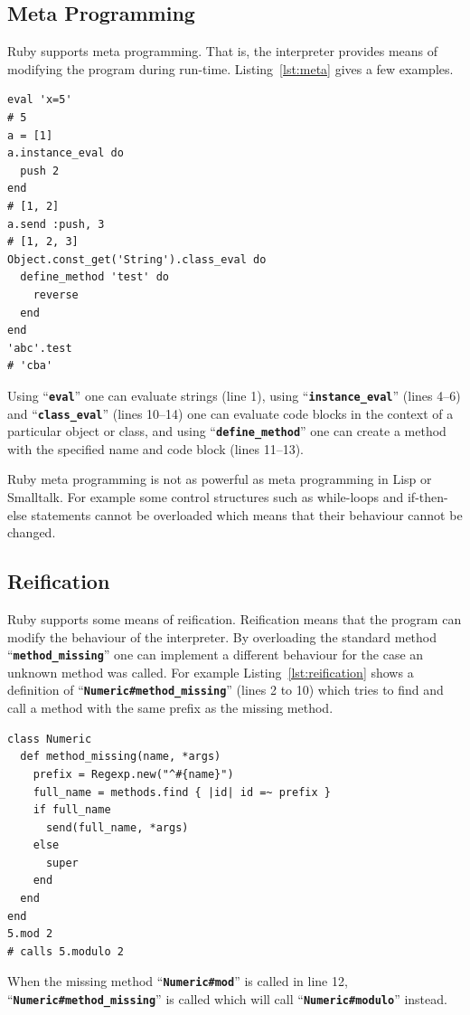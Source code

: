 \documentclass[12pt,a4paper,oneside,openright]{book}
\newcommand{\Eg}{For ex\-am\-ple }
\newcommand{\Ie}{That is, }
\newcommand{\lst}[1]{Listing~\ref{lst:#1}}
\newcommand{\code}[1]{``\texttt{\textbf{\textcolor{codegray}{\small{#1}}}}''}
\begin{document}
\begin{CJK}{UTF8}{}
\subsection{Meta Programming}\label{cha:metaprog}
Ruby supports meta programming. \Ie the interpreter provides means of modifying the program during run-time. \lst{meta} gives a few examples.
\lstset{language=Ruby,frame=single,numbers=left}
\begin{lstlisting}[float=htbp,caption={Meta programming in Ruby},label=lst:meta]
eval 'x=5'                                 
# 5
a = [1]
a.instance_eval do
  push 2
end                                        
# [1, 2]
a.send :push, 3                            
# [1, 2, 3]
Object.const_get('String').class_eval do
  define_method 'test' do
    reverse
  end
end
'abc'.test                                 
# 'cba'
\end{lstlisting}
Using \code{eval} one can evaluate strings (line 1), using \code{instance\_eval} (lines 4--6) and \code{class\_eval} (lines 10--14) one can evaluate code blocks in the context of a particular object or class, and using \code{define\_method} one can create a method with the specified name and code block (lines 11--13).

Ruby meta programming is not as powerful as meta programming in Lisp or Smalltalk. \Eg some control structures such as while-loops and if-then-else statements cannot be overloaded which means that their behaviour cannot be changed.

\subsection{Reification}
Ruby supports some means of reification. Reification means that the program can modify the behaviour of the interpreter. By overloading the standard method \code{method\_missing} one can implement a different behaviour for the case an unknown method was called. \Eg \lst{reification} shows a definition of \code{Numeric\#method\_missing} (lines 2 to 10) which tries to find and call a method with the same prefix as the missing method.
\lstset{language=Ruby,frame=single,numbers=left}
\begin{lstlisting}[float=htbp,caption={Reification in Ruby},label=lst:reification]
class Numeric
  def method_missing(name, *args)
    prefix = Regexp.new("^#{name}")
    full_name = methods.find { |id| id =~ prefix }
    if full_name
      send(full_name, *args)
    else
      super
    end
  end
end
5.mod 2 
# calls 5.modulo 2
\end{lstlisting}
When the missing method \code{Numeric\#mod} is called in line 12, \code{Numeric\#method\_missing} is called which will call \code{Numeric\#modulo} instead.


\end{CJK}
\end{document}
